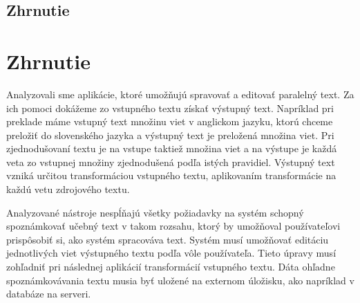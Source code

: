 %
%
{
	\subsection{Zhrnutie}
}
{
	\section{Zhrnutie}
}
\label{subsection:analysis2:zhrnutie}
Analyzovali sme aplikácie, ktoré umožňujú spravovať a editovať paralelný text. Za ich pomoci dokážeme zo vstupného textu získať výstupný text. Napríklad pri preklade máme vstupný text množinu viet v anglickom jazyku, ktorú chceme preložiť do slovenského jazyka a výstupný text je preložená množina viet. Pri zjednodušovaní textu je na vstupe taktiež množina viet a na výstupe je každá veta zo vstupnej množiny zjednodušená podľa istých pravidiel. Výstupný text vzniká určitou transformáciou vstupného textu, aplikovaním transformácie na každú vetu zdrojového textu.

Analyzované nástroje nespĺňajú všetky požiadavky na systém schopný spoznámkovať učebný text v takom rozsahu, ktorý by umožňoval používateľovi prispôsobiť si, ako systém spracováva text. Systém musí umožňovať editáciu jednotlivých viet výstupného textu podľa vôle používateľa. Tieto úpravy musí zohľadniť pri následnej aplikácií transformácií vstupného textu. Dáta ohľadne spoznámkovávania textu musia byť uložené na externom úložisku, ako napríklad v databáze na serveri.
